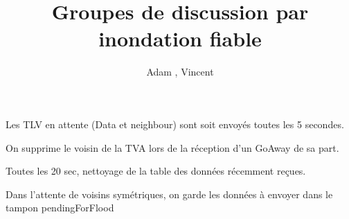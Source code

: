 \documentclass[12pt,a4paper]{article}
\title{Groupes de discussion par inondation fiable}
\author{Adam \bsc{Phillips}, Vincent \bsc{Bonczak}}
\begin{document}
  \maketitle
	
	
	Les TLV en attente (Data et neighbour) sont soit envoyés toutes les 5 secondes.
	
	On supprime le voisin de la TVA lors de la réception d'un GoAway de sa part.
	
	Toutes les 20 sec, nettoyage de la table des données récemment reçues.
	
	Dans l'attente de voisins symétriques, on garde les données à envoyer dans le tampon pendingForFlood
	
\end{document}

